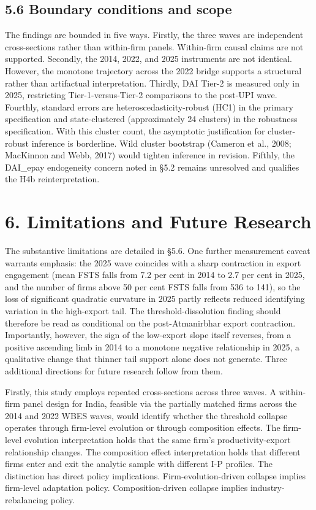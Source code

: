 \documentclass[
  12pt]{article}
\begin{document}
\hypertarget{boundary-conditions-and-scope}{%
\subsection{5.6 Boundary conditions and
scope}\label{boundary-conditions-and-scope}}

The findings are bounded in five ways. Firstly, the three waves are
independent cross-sections rather than within-firm panels. Within-firm
causal claims are not supported. Secondly, the 2014, 2022, and 2025
instruments are not identical. However, the monotone trajectory across
the 2022 bridge supports a structural rather than artifactual
interpretation. Thirdly, DAI Tier-2 is measured only in 2025,
restricting Tier-1-versus-Tier-2 comparisons to the post-UPI wave.
Fourthly, standard errors are heteroscedasticity-robust (HC1) in the
primary specification and state-clustered (approximately 24 clusters) in
the robustness specification. With this cluster count, the asymptotic
justification for cluster-robust inference is borderline. Wild cluster
bootstrap (Cameron et al., 2008; MacKinnon and Webb, 2017) would tighten
inference in revision. Fifthly, the DAI\_epay endogeneity concern noted
in §5.2 remains unresolved and qualifies the H4b reinterpretation.

\hypertarget{limitations-and-future-research}{%
\section{6. Limitations and Future
Research}\label{limitations-and-future-research}}

The substantive limitations are detailed in §5.6. One further
measurement caveat warrants emphasis: the 2025 wave coincides with a
sharp contraction in export engagement (mean FSTS falls from 7.2 per
cent in 2014 to 2.7 per cent in 2025, and the number of firms above 50
per cent FSTS falls from 536 to 141), so the loss of significant
quadratic curvature in 2025 partly reflects reduced identifying
variation in the high-export tail. The threshold-dissolution finding
should therefore be read as conditional on the post-Atmanirbhar export
contraction. Importantly, however, the sign of the low-export slope
itself reverses, from a positive ascending limb in 2014 to a monotone
negative relationship in 2025, a qualitative change that thinner tail
support alone does not generate. Three additional directions for future
research follow from them.

Firstly, this study employs repeated cross-sections across three waves.
A within-firm panel design for India, feasible via the partially matched
firms across the 2014 and 2022 WBES waves, would identify whether the
threshold collapse operates through firm-level evolution or through
composition effects. The firm-level evolution interpretation holds that
the same firm's productivity-export relationship changes. The
composition effect interpretation holds that different firms enter and
exit the analytic sample with different I-P profiles. The distinction
has direct policy implications. Firm-evolution-driven collapse implies
firm-level adaptation policy. Composition-driven collapse implies
industry-rebalancing policy.
\end{document}
